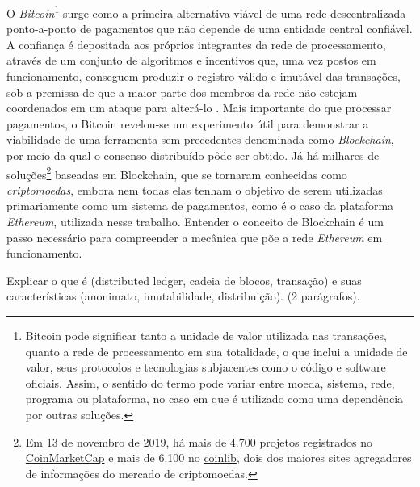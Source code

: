 \documentclass[a4paper,11pt]{article}
\begin{document}
O \emph{Bitcoin}\footnote{Bitcoin pode significar tanto a unidade de valor utilizada nas transações, quanto a rede de processamento em sua totalidade, o que inclui a unidade de valor, seus protocolos e tecnologias subjacentes como o código e software oficiais.
Assim, o sentido do termo pode variar entre moeda, sistema, rede, programa ou plataforma, no caso em que é utilizado como uma dependência por outras soluções.}
surge como a primeira alternativa viável de uma rede descentralizada ponto-a-ponto de pagamentos que não depende de uma entidade central confiável.
A confiança é depositada aos próprios integrantes da rede de processamento, através de um conjunto de algoritmos e incentivos que, uma vez postos em funcionamento, conseguem produzir o registro válido e imutável das transações, sob a premissa de que a maior parte dos membros da rede não estejam coordenados em um ataque para alterá-lo \cite{nakamoto2008bitcoin}.
Mais importante do que processar pagamentos, o Bitcoin revelou-se um experimento útil para demonstrar a viabilidade de uma ferramenta sem precedentes denominada como \emph{Blockchain}, por meio da qual o consenso distribuído pôde ser obtido.
Já há milhares de
soluções\footnote{Em 13 de novembro de 2019, há mais de 4.700 projetos registrados no \href{https://coinmarketcap.com/}{CoinMarketCap} e mais de 6.100 no \href{https://coinlib.io/}{coinlib}, dois dos maiores sites agregadores de informações do mercado de criptomoedas.}
baseadas em Blockchain, que se tornaram conhecidas como \emph{criptomoedas}, embora nem todas elas tenham o objetivo de serem utilizadas primariamente como um sistema de pagamentos, como é o caso da plataforma \emph{Ethereum}, utilizada nesse trabalho.
Entender o conceito de Blockchain é um passo necessário para compreender a mecânica que põe a rede \emph{Ethereum} em funcionamento.

{\color{ForestGreen}Explicar o que é (distributed ledger, cadeia de blocos, transação) e suas características (anonimato, imutabilidade, distribuição). (2 parágrafos).}
\end{document}
